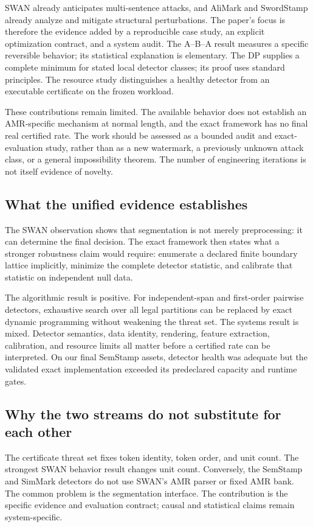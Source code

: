\documentclass[10pt]{article}
\begin{document}
SWAN already anticipates multi-sentence attacks, and AliMark and SwordStamp
already analyze and mitigate structural perturbations. The paper's focus
is therefore the evidence added by a reproducible case study, an explicit
optimization contract, and a system audit. The A--B--A result measures a
specific reversible behavior; its statistical explanation is elementary.
The DP supplies a complete minimum for stated local detector classes; its
proof uses standard principles. The resource study distinguishes a healthy
detector from an executable certificate on the frozen workload.

These contributions remain limited. The available behavior does not
establish an AMR-specific mechanism at normal length, and the exact
framework has no final real certified rate. The work should be assessed
as a bounded audit and exact-evaluation study, rather than as a new
watermark, a previously unknown attack class, or a general impossibility
theorem. The number of engineering iterations is not itself evidence of
novelty.

\subsection{What the unified evidence establishes}

The SWAN observation shows that segmentation is not merely preprocessing:
it can determine the final decision. The exact framework then states what a
stronger robustness claim would require: enumerate a declared finite
boundary lattice implicitly, minimize the complete detector statistic, and
calibrate that statistic on independent null data.

The algorithmic result is positive. For independent-span and first-order
pairwise detectors, exhaustive search over all legal partitions can be
replaced by exact dynamic programming without weakening the threat set. The
systems result is mixed. Detector semantics, data identity, rendering,
feature extraction, calibration, and resource limits all matter before a
certified rate can be interpreted. On our final SemStamp assets, detector
health was adequate but the validated exact implementation exceeded its
predeclared capacity and runtime gates.

\subsection{Why the two streams do not substitute for each other}

The certificate threat set fixes token identity, token order, and unit count.
The strongest SWAN behavior result changes unit count. Conversely, the
SemStamp and SimMark detectors do not use SWAN's AMR parser or fixed AMR bank.
The common problem is the segmentation interface. The contribution is the
specific evidence and evaluation contract; causal and statistical claims
remain system-specific.
\end{document}

